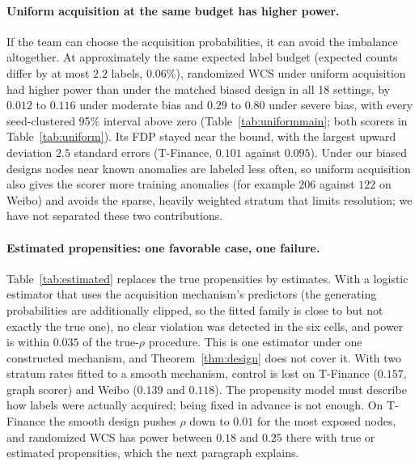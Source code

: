 \documentclass[twoside]{article}
\begin{document}
\paragraph{Uniform acquisition at the same budget has higher power.}
If the team can choose the acquisition probabilities, it can avoid the imbalance altogether. At approximately the same expected label budget (expected counts differ by at most $2.2$ labels, $0.06\%$), randomized WCS under uniform acquisition had higher power than under the matched biased design in all 18 settings, by $0.012$ to $0.116$ under moderate bias and $0.29$ to $0.80$ under severe bias, with every seed-clustered 95\% interval above zero (Table~\ref{tab:uniformmain}; both scorers in Table~\ref{tab:uniform}). Its FDP stayed near the bound, with the largest upward deviation $2.5$ standard errors (T-Finance, $0.101$ against $0.095$). Under our biased designs nodes near known anomalies are labeled less often, so uniform acquisition also gives the scorer more training anomalies (for example $206$ against $122$ on Weibo) and avoids the sparse, heavily weighted stratum that limits resolution; we have not separated these two contributions.

\begin{table}[t]
\centering\small
\caption{Smooth acquisition design with the true, estimated and misspecified propensities: mean FDP / power at nominal $0.10$ over ten seeds, five splits and ten acquisition draws on frozen scores. The estimate is a cross-fitted logistic regression on the acquisition indicators; the misspecified estimate uses two stratum rates. Theorem~\ref{thm:design} covers only the true-$\rho$ column.}
\label{tab:estimated}
\end{table}

\paragraph{Estimated propensities: one favorable case, one failure.}
Table~\ref{tab:estimated} replaces the true propensities by estimates. With a logistic estimator that uses the acquisition mechanism's predictors (the generating probabilities are additionally clipped, so the fitted family is close to but not exactly the true one), no clear violation was detected in the six cells, and power is within $0.035$ of the true-$\rho$ procedure. This is one estimator under one constructed mechanism, and Theorem~\ref{thm:design} does not cover it. With two stratum rates fitted to a smooth mechanism, control is lost on T-Finance ($0.157$, graph scorer) and Weibo ($0.139$ and $0.118$). The propensity model must describe how labels were actually acquired; being fixed in advance is not enough. On T-Finance the smooth design pushes $\rho$ down to $0.01$ for the most exposed nodes, and randomized WCS has power between $0.18$ and $0.25$ there with true or estimated propensities, which the next paragraph explains.
\end{document}
